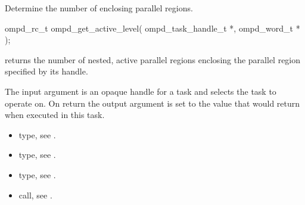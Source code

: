\label{subsubsubsec:ompd_get_active_level}
\summary
Determine the number of enclosing  parallel regions.

\format
\begin{cspecific}
\begin{ompSyntax}
ompd_rc_t ompd_get_active_level(
  ompd_task_handle_t *,
  ompd_word_t *
);
\end{ompSyntax}
\end{cspecific}

\descr
{} returns the number of nested, active
parallel regions enclosing the parallel region specified by its handle.

\argdesc
The input argument  is an opaque handle for a task and selects the task to operate on.
On return the output argument  is set to the value that  would return when
executed in this task.

\crossreferences
\begin{itemize}
  \item {} type, see .
	\item {} type, see .
	\item {} type, see .
	\item {} call, see .
\end{itemize}

%
%
%


